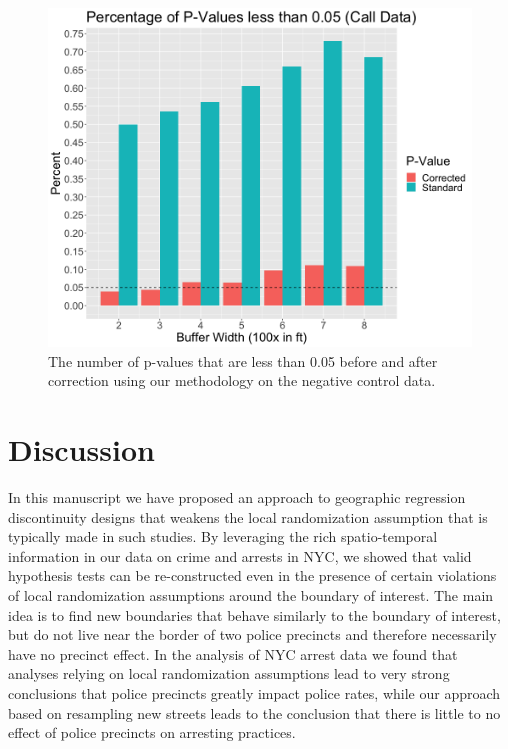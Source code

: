 \documentclass[a4paper,11pt]{article}
\begin{document}
\begin{figure}
    \centering
    \includegraphics[scale=0.25]{plots/NegControlFinal.png}
        \caption{The number of p-values that are less than 0.05 before and after correction using our methodology on the negative control data.}
    \label{fig:NegControlRej}
\end{figure}



\section{Discussion}

In this manuscript we have proposed an approach to geographic regression discontinuity designs that weakens the local randomization assumption that is typically made in such studies. By leveraging the rich spatio-temporal information in our data on crime and arrests in NYC, we showed that valid hypothesis tests can be re-constructed even in the presence of certain violations of local randomization assumptions around the boundary of interest. The main idea is to find new boundaries that behave similarly to the boundary of interest, but do not live near the border of two police precincts and therefore necessarily have no precinct effect. In the analysis of NYC arrest data we found that analyses relying on local randomization assumptions lead to very strong conclusions that police precincts greatly impact police rates, while our approach based on resampling new streets leads to the conclusion that there is little to no effect of police precincts on arresting practices. 
\end{document}
